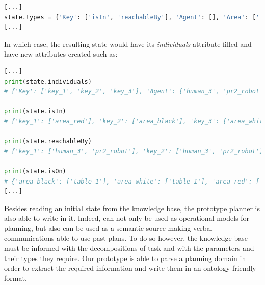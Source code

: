 \documentclass[a4paper,11pt,twoside]{StyleThese}
\begin{document}

\begin{lstlisting}[language=Python]
[...]
state.types = {'Key': ['isIn', 'reachableBy'], 'Agent': [], 'Area': ['isOn']}
[...]
\end{lstlisting}
In which case, the resulting state would have its \textit{individuals} attribute filled and have new attributes created such as:


\begin{lstlisting}[language=Python]
[...]
print(state.individuals)
# {'Key': ['key_1', 'key_2', 'key_3'], 'Agent': ['human_3', 'pr2_robot'], 'Area': ['area_black', 'area_white', 'area_red'], 'Table': ['table_1']}

print(state.isIn)
# {'key_1': ['area_red'], 'key_2': ['area_black'], 'key_3': ['area_white']}

print(state.reachableBy)
# {'key_1': ['human_3', 'pr2_robot'], 'key_2': ['human_3', 'pr2_robot'], 'key_3': ['human_3', 'pr2_robot']}

print(state.isOn)
# {'area_black': ['table_1'], 'area_white': ['table_1'], 'area_red': ['table_1']}
[...]
\end{lstlisting}


Besides reading an initial state from the knowledge base, the prototype planner is also able to write in it. Indeed,  can not only be used as operational models for planning, but also can be used as a semantic source making verbal communications able to use past plans. To do so however, the knowledge base must be informed with the decompositions of task and with the parameters and their types they require. Our prototype is able to parse a planning domain in order to extract the required information and write them in an ontology friendly format.
\end{document}
